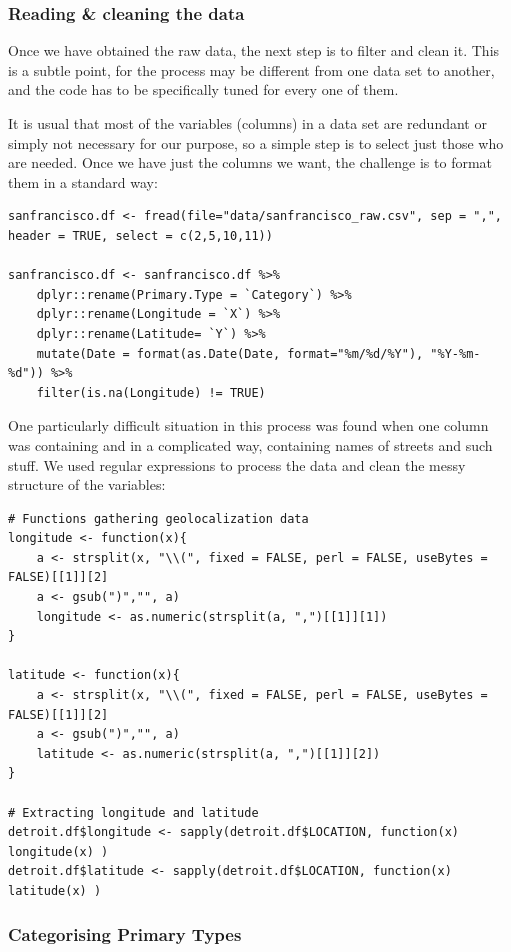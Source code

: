 \subsubsection*{Reading \& cleaning the data}

Once we have obtained the raw data, the next step is to filter and clean it. This is a subtle point, for the process may be different from one data set to another, and the code has to be specifically tuned for every one of them.

It is usual that most of the variables (columns) in a data set are redundant or simply not necessary for our purpose, so a simple step is to select just those who are needed.  Once we have just the columns we want, the challenge is to format them in a standard way:
\begin{lstlisting}
sanfrancisco.df <- fread(file="data/sanfrancisco_raw.csv", sep = ",", header = TRUE, select = c(2,5,10,11))

sanfrancisco.df <- sanfrancisco.df %>%
	dplyr::rename(Primary.Type = `Category`) %>%
	dplyr::rename(Longitude = `X`) %>%
	dplyr::rename(Latitude= `Y`) %>%
	mutate(Date = format(as.Date(Date, format="%m/%d/%Y"), "%Y-%m-%d")) %>%
	filter(is.na(Longitude) != TRUE)
\end{lstlisting}

One particularly difficult situation in this process was found when one column was containing  and  in a complicated way, containing names of streets and such stuff. We used regular expressions to process the data and clean the messy structure of the variables:
\begin{lstlisting}
# Functions gathering geolocalization data
longitude <- function(x){
	a <- strsplit(x, "\\(", fixed = FALSE, perl = FALSE, useBytes = FALSE)[[1]][2]
	a <- gsub(")","", a)
	longitude <- as.numeric(strsplit(a, ",")[[1]][1])
}

latitude <- function(x){
	a <- strsplit(x, "\\(", fixed = FALSE, perl = FALSE, useBytes = FALSE)[[1]][2]
	a <- gsub(")","", a)
	latitude <- as.numeric(strsplit(a, ",")[[1]][2])
}

# Extracting longitude and latitude
detroit.df$longitude <- sapply(detroit.df$LOCATION, function(x) longitude(x) )
detroit.df$latitude <- sapply(detroit.df$LOCATION, function(x) latitude(x) )
\end{lstlisting}


\subsubsection*{Categorising Primary Types}

